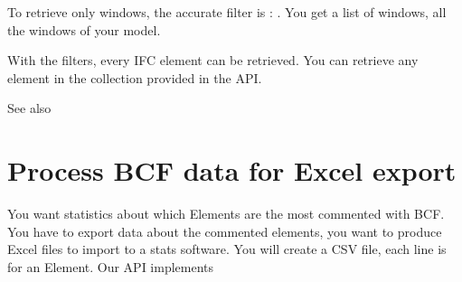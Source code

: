 \documentclass[a4paper,12pt,english]{sphinxmanual}
\begin{document}
To retrieve only windows, the accurate filter is : .
You get a list of windows, all the windows of your model.

%
\begin{sphinxVerbatim}[commandchars=\\\{\}]
 

  
     
  
    
   

  
\end{sphinxVerbatim}

With the filters, every IFC element can be retrieved. You can retrieve any element in the collection provided in the API.




See also {\hyperref[\detokenize{api/introduction::doc}]{}}




\section{Process BCF data for Excel export}
\label{\detokenize{tutorials/export_excel:process-bcf-data-for-excel-export}}\label{\detokenize{tutorials/export_excel::doc}}
You want statistics about which Elements are the most commented with BCF.
You have to export data about the commented elements, you want to produce Excel files to import to a stats software.
You will create a CSV file, each line is for an Element.
Our API implements %
\begin{footnote}[10]\sphinxAtStartFootnote
{}
%
\end{footnote}
\end{document}

